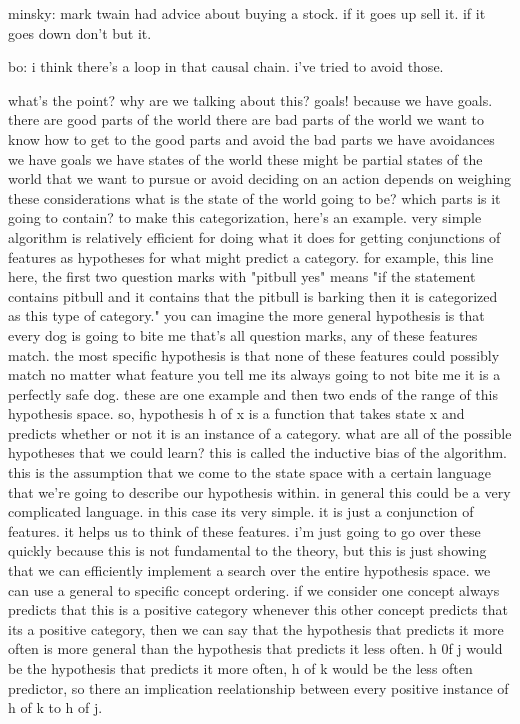 minsky: mark twain had advice about buying a stock.
if it goes up sell it.
if it goes down don't but it.

bo: i think there's a loop in that causal chain.
i've tried to avoid those.

what's the point?
why are we talking about this?
goals!
because we have goals.
there are good parts of the world
there are bad parts of the world
we want to know how to get to the good parts and avoid the bad parts
we have avoidances
we have goals
we have states of the world
these might be partial states of the world that we want to pursue or avoid
deciding on an action depends on weighing these considerations
what is the state of the world going to be?
which parts is it going to contain?
to make this categorization, here's an example.
very simple algorithm is relatively efficient for doing what it does for getting conjunctions of features as hypotheses for what might predict a category.
for example, this line here, the first two question marks with "pitbull yes" means "if the statement contains pitbull and it contains that the pitbull is barking then it is categorized as this type of category."
you can imagine the more general hypothesis is that every dog is going to bite me
that's all question marks, any of these features match.
the most specific hypothesis is that none of these features could possibly match
no matter what feature you tell me its always going to not bite me
it is a perfectly safe dog.
these are one example and then two ends of the range of this hypothesis space.
so, hypothesis h of x is a function that takes state x and predicts whether or not it is an instance of a category.
what are all of the possible hypotheses that we could learn?
this is called the inductive bias of the algorithm.
this is the assumption that we come to the state space with a certain language that we're going to describe our hypothesis within.
in general this could be a very complicated language.
in this case its very simple.
it is just a conjunction of features.
it helps us to think of these features.
i'm just going to go over these quickly because this is not fundamental to the theory, but this is just showing that we can efficiently implement a search over the entire hypothesis space.
we can use a general to specific concept ordering.
if we consider one concept always predicts that this is a positive category whenever this other concept predicts that its a positive category, then we can say that the hypothesis that predicts it more often is more general than the hypothesis that predicts it less often.
h 0f j would be the hypothesis that predicts it more often, h of k would be the less often predictor, so there an implication reelationship between every positive instance of h of k to h of j.

